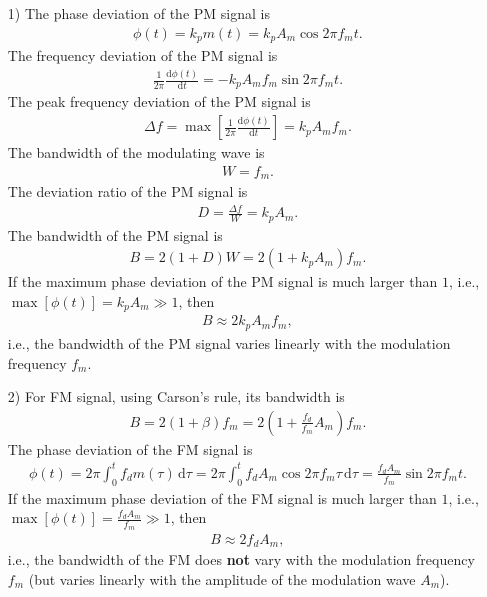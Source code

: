 \documentclass{assignment}
\begin{document}
\begin{sol}
    \begin{itemize}
        \item[1)] The phase deviation of the PM signal is
        \begin{align}
            \phi(t)=k_pm(t)=k_pA_m\cos 2\pi f_mt.
        \end{align}
        The frequency deviation of the PM signal is
        \begin{align}
            \frac{1}{2\pi}\frac{\mathrm{d}\phi(t)}{\mathrm{d}t}=-k_pA_mf_m\sin 2\pi f_mt.
        \end{align}
        The peak frequency deviation of the PM signal is
        \begin{align}
            \Delta f=\max\left[\frac{1}{2\pi}\frac{\mathrm{d}\phi(t)}{\mathrm{d}t}\right]=k_pA_mf_m.
        \end{align}
        The bandwidth of the modulating wave is
        \begin{align}
            W=f_m.
        \end{align}
        The deviation ratio of the PM signal is
        \begin{align}
            D=\frac{\Delta f}{W}=k_pA_m.
        \end{align}
        The bandwidth of the PM signal is
        \begin{align}
            B=2(1+D)W=2(1+k_pA_m)f_m.
        \end{align}
        If the maximum phase deviation of the PM signal is much larger than $1$, i.e., $\max\left[\phi(t)\right]=k_pA_m\gg 1$, then
        \begin{align}
            B\approx 2k_pA_mf_m,
        \end{align}
        i.e., the bandwidth of the PM signal varies linearly with the modulation frequency $f_m$.
        \item[2)] For FM signal, using Carson's rule, its bandwidth is
        \begin{align}
            B=2(1+\beta)f_m=2\left(1+\frac{f_d}{f_m}A_m\right)f_m.
        \end{align}
        The phase deviation of the FM signal is
        \begin{align}
            \phi(t)=2\pi\int_0^tf_dm(\tau)\,\mathrm{d}\tau=2\pi \int_0^tf_dA_m\cos 2\pi f_m\tau\,\mathrm{d}\tau=\frac{f_dA_m}{f_m}\sin 2\pi f_mt.
        \end{align}
        If the maximum phase deviation of the FM signal is much larger than $1$, i.e., $\max[\phi(t)]=\frac{f_dA_m}{f_m}\gg 1$, then
        \begin{align}
            B\approx 2f_dA_m,
        \end{align}
        i.e., the bandwidth of the FM does \textbf{not} vary with the modulation frequency $f_m$ (but varies linearly with the amplitude of the modulation wave $A_m$).
    \end{itemize}
\end{sol}
\end{document}
